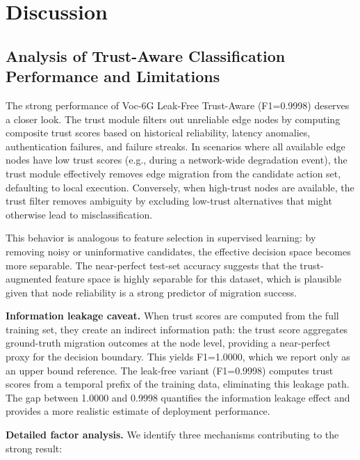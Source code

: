 \documentclass[10pt,letterpaper]{article}
\providecommand{\VocSixG}{Voc-6G}
\begin{document}
\section*{Discussion}
\label{sec:discussion}

\subsection*{Analysis of Trust-Aware Classification Performance and Limitations}

The strong performance of \VocSixG{} Leak-Free Trust-Aware (F1=0.9998) deserves a closer look. The trust module filters out unreliable edge nodes by computing composite trust scores based on historical reliability, latency anomalies, authentication failures, and failure streaks. In scenarios where all available edge nodes have low trust scores (e.g., during a network-wide degradation event), the trust module effectively removes edge migration from the candidate action set, defaulting to local execution. Conversely, when high-trust nodes are available, the trust filter removes ambiguity by excluding low-trust alternatives that might otherwise lead to misclassification.

This behavior is analogous to feature selection in supervised learning: by removing noisy or uninformative candidates, the effective decision space becomes more separable. The near-perfect test-set accuracy suggests that the trust-augmented feature space is highly separable for this dataset, which is plausible given that node reliability is a strong predictor of migration success.

\textbf{Information leakage caveat.} When trust scores are computed from the full training set, they create an indirect information path: the trust score aggregates ground-truth migration outcomes at the node level, providing a near-perfect proxy for the decision boundary. This yields F1=1.0000, which we report only as an upper bound reference. The leak-free variant (F1=0.9998) computes trust scores from a temporal prefix of the training data, eliminating this leakage path. The gap between 1.0000 and 0.9998 quantifies the information leakage effect and provides a more realistic estimate of deployment performance.

\textbf{Detailed factor analysis.} We identify three mechanisms contributing to the strong result:
\end{document}
